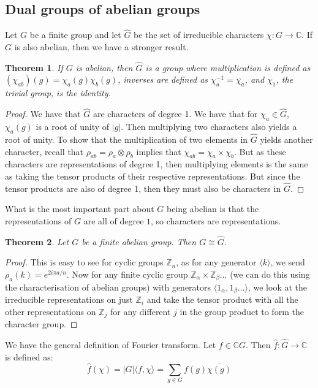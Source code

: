 \documentclass[]{article}
\newtheorem{theorem}{Theorem}
\theoremstyle{definition}
\numberwithin{theorem}{section}
\numberwithin{equation}{section}
\begin{document}
\subsection{Dual groups of abelian groups}
Let $G$ be a finite group and let $\widehat{G}$ be the set of irreducible characters $\chi: G \rightarrow \mathbb{C}$. If $G$ is also abelian, then we have a stronger result. 
\begin{theorem}
	If $G$ is abelian, then $\widehat{G}$ is a group where multiplication is defined as $(\chi_{ab})(g) = \chi_a(g)\chi_b(g)$, inverses are defined as $\chi_a^{-1} = \overline{\chi_a}$, and $\chi_1$, the trivial group, is the identity. 
\end{theorem}
\begin{proof}
	We have that $\widehat{G}$ are characters of degree 1.
	 We have that for $\chi_a \in \widehat{G}$, $\chi_a(g)$ is a root of unity of $|g|$. Then multiplying two characters also yields a root of unity. To show that the multiplication of two elements in $\widehat{G}$ yields another character, recall that $\rho_{ab} = \rho_a \otimes \rho_b$ implies that $\chi_{ab} = \chi_a \times \chi_b$. But as these characters are representations of degree 1, then multiplying elements is the same as taking the tensor products of their respective representations. But since the tensor products are also of degree 1, then they must also be characters in $\widehat{G}$. 
\end{proof}
What is the most important part about $G$ being abelian is that the representations of $G$ are all of degree $1$, so characters are representations. 
\begin{theorem}
	Let $G$ be a finite abelian group. Then $G \cong \widehat{G}$.
\end{theorem}
\begin{proof}
	This is easy to see for cyclic groups $\mathbb{Z}_n$, as for any generator $\langle k \rangle$, we send $\rho_a(k) = e^{2 i \pi a / n}$. Now for any finite cyclic group $\mathbb{Z}_{\alpha} \times \mathbb{Z}_{\beta}... $ (we can do this using the characterisation of abelian groups) with generators $\langle 1_{\alpha}, 1_\beta... \rangle$, we look at the irreducible representations on just $\mathbb{Z}_{i}$ and take the tensor product with all the other representations on $\mathbb{Z}_j$ for any different $j$ in the group product to form the character group. 
\end{proof}

We have the general definition of Fourier transform. Let $f \in \mathbb{C}G$. Then $\widehat{f}: \widehat{G} \rightarrow \mathbb{C}$ is defined as:
\begin{equation}
	\widehat{f}(\chi) = |G| \langle f, \chi \rangle = \sum_{g \in G} f(g) \overline{\chi(g)}
\end{equation}
\end{document}

